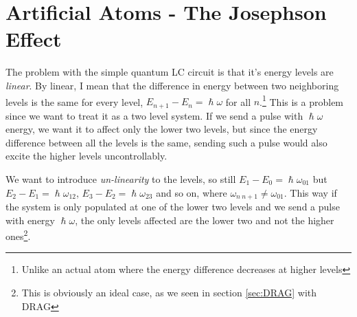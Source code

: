 \section{Artificial Atoms - The Josephson Effect}
The problem with the simple quantum LC circuit is that it's energy levels are \textit{linear}. By linear, I mean that the difference in energy between two neighboring levels is the same for every level, $E_{n + 1} - E_n = \hslash \omega$ for all $n$.\footnote{Unlike an actual atom where the energy difference decreases at higher levels} This is a problem since we want to treat it as a two level system. If we send a pulse with $\hslash \omega$ energy, we want it to affect only the lower two levels, but since the energy difference between all the levels is the same, sending such a pulse would also excite the higher levels uncontrollably.

We want to introduce \textit{un-linearity} to the levels, so still $E_1 - E_0 = \hslash \omega_{01} $ but $E_2 - E_1 = \hslash \omega_{12}$, $E_3 - E_2 = \hslash \omega_{23}$ and so on, where $\omega_{n\ n+1} \ne \omega_{01}$. This way if the system is only populated at one of the lower two levels and we send a pulse with energy $\hslash \omega$, the only levels affected are the lower two and not the higher ones\footnote{This is obviously an ideal case, as we seen in section \ref{sec:DRAG} with DRAG}.

